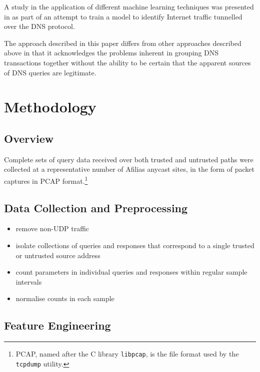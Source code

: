 \documentclass[conference]{IEEEtran}
\let\citep\cite
\let\tightlist\relax %
\begin{document}
A study in the application of different machine learning techniques was
presented in \citep{Sammour2017} as part of an attempt to train a model
to identify Internet traffic tunnelled over the DNS protocol.

The approach described in this paper differs from other approaches
described above in that it acknowledges the problems inherent in
grouping DNS transactions together without the ability to be certain
that the apparent sources of DNS queries are legitimate.

\section{Methodology}\label{sec:methodology}

\label{sec:methodology}

\subsection{Overview}\label{sec:overview}

Complete sets of query data received over both trusted and untrusted
paths were collected at a representative number of Afilias anycast
sites, in the form of packet captures in PCAP
format.\footnote{PCAP, named after the C library \texttt{libpcap}, is the file format used by the \texttt{tcpdump} utility.}

\subsection{Data Collection and
Preprocessing}\label{sec:data-collection-and-preprocessing}

\begin{itemize}
\tightlist
\item
  remove non-UDP traffic
\item
  isolate collections of queries and responses that correspond to a
  single trusted or untrusted source address
\item
  count parameters in individual queries and responses within regular
  sample intervals
\item
  normalise counts in each sample
\end{itemize}

\subsection{Feature Engineering}\label{sec:feature-engineering}
\end{document}
